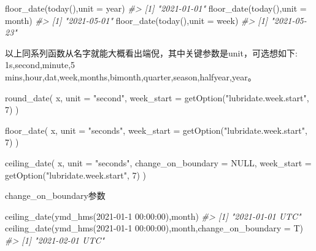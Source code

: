 \documentclass[
]{book}
\newenvironment{Shaded}{\begin{snugshade}}{\end{snugshade}}
\newcommand{\AttributeTok}[1]{\textcolor[rgb]{0.77,0.63,0.00}{#1}}
\newcommand{\CommentTok}[1]{\textcolor[rgb]{0.56,0.35,0.01}{\textit{#1}}}
\newcommand{\ConstantTok}[1]{\textcolor[rgb]{0.00,0.00,0.00}{#1}}
\newcommand{\DecValTok}[1]{\textcolor[rgb]{0.00,0.00,0.81}{#1}}
\newcommand{\FunctionTok}[1]{\textcolor[rgb]{0.00,0.00,0.00}{#1}}
\newcommand{\NormalTok}[1]{#1}
\newcommand{\StringTok}[1]{\textcolor[rgb]{0.31,0.60,0.02}{#1}}
\begin{document}
\begin{Shaded}
\begin{Highlighting}[]
\FunctionTok{floor\_date}\NormalTok{(}\FunctionTok{today}\NormalTok{(),}\AttributeTok{unit =} \StringTok{\textquotesingle{}year\textquotesingle{}}\NormalTok{)}
\CommentTok{\#\textgreater{} [1] "2021{-}01{-}01"}
\FunctionTok{floor\_date}\NormalTok{(}\FunctionTok{today}\NormalTok{(),}\AttributeTok{unit =} \StringTok{\textquotesingle{}month\textquotesingle{}}\NormalTok{) }
\CommentTok{\#\textgreater{} [1] "2021{-}05{-}01"}
\FunctionTok{floor\_date}\NormalTok{(}\FunctionTok{today}\NormalTok{(),}\AttributeTok{unit =} \StringTok{\textquotesingle{}week\textquotesingle{}}\NormalTok{)}
\CommentTok{\#\textgreater{} [1] "2021{-}05{-}23"}
\end{Highlighting}
\end{Shaded}

以上同系列函数从名字就能大概看出端倪，其中关键参数是unit，可选想如下:
1s,second,minute,5 mins,hour,dat,week,months,bimonth,quarter,season,halfyear,year。

\begin{Shaded}
\begin{Highlighting}[]
\FunctionTok{round\_date}\NormalTok{(}
\NormalTok{  x,}
  \AttributeTok{unit =} \StringTok{"second"}\NormalTok{,}
  \AttributeTok{week\_start =} \FunctionTok{getOption}\NormalTok{(}\StringTok{"lubridate.week.start"}\NormalTok{, }\DecValTok{7}\NormalTok{)}
\NormalTok{)}

\FunctionTok{floor\_date}\NormalTok{(}
\NormalTok{  x,}
  \AttributeTok{unit =} \StringTok{"seconds"}\NormalTok{,}
  \AttributeTok{week\_start =} \FunctionTok{getOption}\NormalTok{(}\StringTok{"lubridate.week.start"}\NormalTok{, }\DecValTok{7}\NormalTok{)}
\NormalTok{)}

\FunctionTok{ceiling\_date}\NormalTok{(}
\NormalTok{  x,}
  \AttributeTok{unit =} \StringTok{"seconds"}\NormalTok{,}
  \AttributeTok{change\_on\_boundary =} \ConstantTok{NULL}\NormalTok{,}
  \AttributeTok{week\_start =} \FunctionTok{getOption}\NormalTok{(}\StringTok{"lubridate.week.start"}\NormalTok{, }\DecValTok{7}\NormalTok{)}
\NormalTok{)}
\end{Highlighting}
\end{Shaded}

change\_on\_boundary参数

\begin{Shaded}
\begin{Highlighting}[]
\FunctionTok{ceiling\_date}\NormalTok{(}\FunctionTok{ymd\_hms}\NormalTok{(}\StringTok{\textquotesingle{}2021{-}01{-}1 00:00:00\textquotesingle{}}\NormalTok{),}\StringTok{\textquotesingle{}month\textquotesingle{}}\NormalTok{)}
\CommentTok{\#\textgreater{} [1] "2021{-}01{-}01 UTC"}
\FunctionTok{ceiling\_date}\NormalTok{(}\FunctionTok{ymd\_hms}\NormalTok{(}\StringTok{\textquotesingle{}2021{-}01{-}1 00:00:00\textquotesingle{}}\NormalTok{),}\StringTok{\textquotesingle{}month\textquotesingle{}}\NormalTok{,}\AttributeTok{change\_on\_boundary =}\NormalTok{ T)}
\CommentTok{\#\textgreater{} [1] "2021{-}02{-}01 UTC"}
\end{Highlighting}
\end{Shaded}
\end{document}
